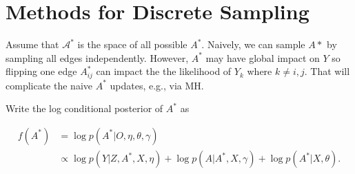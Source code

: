 \documentclass[12pt]{article}
\begin{document}
\section{Methods for Discrete Sampling}
Assume that $\mathcal{A}^\ast$ is the space of all possible $A^\ast$.
Naively, we can sample $A*$ by sampling all edges independently. 
However, $A^\ast$ may have global impact on $Y$ so flipping one edge $A^\ast_{ij}$
can impact the the likelihood of $Y_k$ where $k \neq i,j$. 
That will complicate the naive $A^\ast$ updates, e.g., via MH.

Write the log conditional posterior of $A^\ast$ as

\begin{equation}
    \begin{split} 
        \label{eq:conditional.A}
        f(A^\ast) &= \log p(A^\ast \vert O, \eta,\theta,\gamma) 
        \\ &\propto
        \log p(Y \vert Z,A^\ast,X,\eta) + \log p(A \vert A^\ast, X,\gamma) + \log p(A^\ast \vert X,\theta).
    \end{split}
\end{equation}
\end{document}

